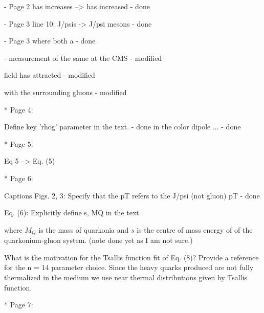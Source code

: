 \documentclass[a4paper,11pt]{article}
\begin{document}
- Page 2 has increases --> has increased
- {\color{blue} done} \newline

- Page 3 line 10: J/psis -> J/psi mesons \newline
- {\color{blue} done} \newline

- Page 3 where both a \newline
- {\color{blue} done} \newline

- measurement of the same at the CMS \newline
- {\color{blue} modified} \newline

field has attracted 
- {\color{blue} modified} \newline

 with the surrounding gluons 
 - {\color{blue} modified} \newline
 
* Page 4: \newline

 Define key 'rhog' parameter in the text. \newline 
- {\color{blue} done} \newline
 in the color dipole ... \newline
- {\color{blue} done}\newline

* Page 5: \newline

 Eq 5 --> Eq. (5) \newline

* Page 6: \newline

Captions Figs. 2, 3: Specify that the pT refers to the J/psi (not gluon) pT 
- {\color{blue} done}\newline

Eq. (6): Explicitly define s, MQ in the text.

{\color{red} where $M_{Q}$ is the mass of quarkonia and $s$ is the centre of mass energy of
of the quarkonium-gluon system. (note done yet as I am not sure.)}

What is the motivation for the Tsallis function fit of Eq. (8)? Provide 
a reference for the n = 14 parameter choice. 
{\color{red} Since the heavy quarks produced are not fully thermalized in the medium
  we use near thermal distributions given by Tsallis function. 
}

* Page 7: 
\end{document}
